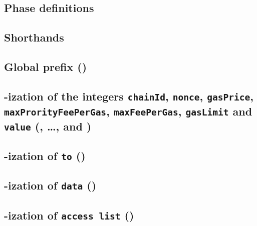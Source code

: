 \def\localSectionTitle {\rlp{}-ization of the integers \texttt{chainId}, \texttt{nonce}, \texttt{gasPrice}, \texttt{maxProrityFeePerGas}, \texttt{maxFeePerGas}, \texttt{gasLimit} and \texttt{value} }

\subsection{Phase definitions}                                                                    \label{rlp txn v2: phase constraints: definitions}    
\subsection{Shorthands}                                                                           \label{rlp txn v2: phase constraints: shorthands}     
\subsection{Global \rlp{} prefix (\phaseRlpPrefix)}                                               \label{rlp txn v2: phase constraints: rlp prefix}     
\subsection{\localSectionTitle{} (\phaseChainId{}, \dots, \phaseGasLimit{} and \phaseValue{})}    \label{rlp txn v2: phase constraints: integers}       
\subsection{\rlp{}-ization of \texttt{to} (\phaseTo)}                                             \label{rlp txn v2: phase constraints: to address}         
\subsection{\rlp{}-ization of \texttt{data} (\phaseData)}                                         \label{rlp txn v2: phase constraints: payload}        
\subsection{\rlp{}-ization of \texttt{access list} (\phaseAccessList)}                            \label{rlp txn v2: phase constraints: access list}    
